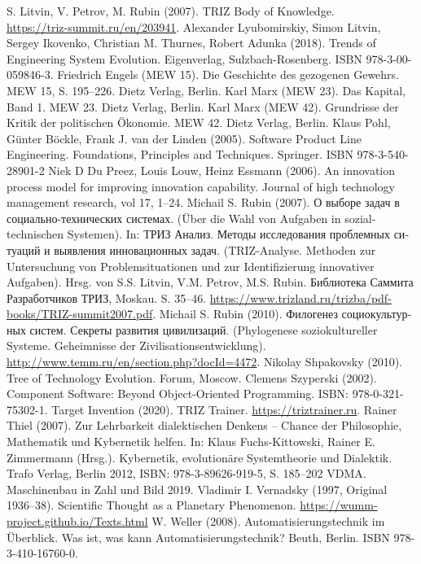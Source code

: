 \documentclass[11pt,a4paper]{article}
\begin{document}
\begin{thebibliography}{xxx}
 S. Litvin, V. Petrov, M. Rubin (2007). TRIZ Body of
  Knowledge. \\ \url{https://triz-summit.ru/en/203941}.
 Alexander Lyubomirskiy, Simon Litvin, Sergey Ikovenko,
  Christian M. Thurnes, Robert Adunka (2018). Trends of Engineering System
  Evolution. Eigenverlag, Sulzbach-Rosenberg.  ISBN 978-3-00-059846-3.
 Friedrich Engels (MEW 15). Die Geschichte des gezogenen
  Gewehrs.  MEW 15, S. 195--226. Dietz Verlag, Berlin.
 Karl Marx (MEW 23). Das Kapital, Band 1. MEW 23. Dietz Verlag,
  Berlin.
 Karl Marx (MEW 42). Grundrisse der Kritik der politischen
  Ökonomie.  MEW 42. Dietz Verlag, Berlin.
 Klaus Pohl, Günter Böckle, Frank J. van der Linden (2005).
  Software Product Line Engineering. Foundations, Principles and Techniques.
  Springer. ISBN 978-3-540-28901-2
 Niek D Du Preez, Louis Louw, Heinz Essmann (2006). An
  innovation process model for improving innovation capability.  Journal of
  high technology management research, vol 17, 1--24.
 Michail S. Rubin (2007). \foreignlanguage{russian}{О
  выборе задач в социально-технических системах}. (Über die Wahl von Aufgaben
  in sozial-technischen Systemen). In: \foreignlanguage{russian}{ТРИЗ Анализ.
    Методы исследования проблемных ситуаций и выявления инновационных
    задач}. (TRIZ-Analyse. Methoden zur Untersuchung von Problemsituationen
  und zur Identifizierung innovativer Aufgaben). Hrsg. von S.S. Litvin,
  V.M. Petrov, M.S. Rubin. \foreignlanguage{russian}{Библиотека Саммита
    Разработчиков ТРИЗ}, Moskau. S. 35--46.
  \url{https://www.trizland.ru/trizba/pdf-books/TRIZ-summit2007.pdf}.
 Michail S. Rubin (2010).
  \foreignlanguage{russian}{Филогенез социокультурных систем. Секреты развития
    цивилизаций}.  (Phylogenese soziokultureller Systeme. Geheimnisse der
  Zivilisationsentwicklung).
  \url{http://www.temm.ru/en/section.php?docId=4472}.
 Nikolay Shpakovsky (2010).  Tree of Technology
  Еvolution. Forum, Moscow.
 Clemens Szyperski (2002). Component Software: Beyond
  Object-Oriented Programming. ISBN: 978-0-321-75302-1.
 Target Invention (2020). TRIZ Trainer.
  \url{https://triztrainer.ru}.
 Rainer Thiel (2007). Zur Lehrbarkeit dialektischen Denkens
  – Chance der Philosophie, Mathematik und Kybernetik helfen. In: Klaus
  Fuchs-Kittowski, Rainer E. Zimmermann (Hrsg.). Kybernetik, evolutionäre
  Systemtheorie und Dialektik. Trafo Verlag, Berlin 2012, ISBN:
  978-3-89626-919-5, S. 185--202
 VDMA. Maschinenbau in Zahl und Bild 2019. 
 Vladimir I. Vernadsky (1997, Original 1936--38).
  Scientific Thought as a Planetary Phenomenon.
  \url{https://wumm-project.github.io/Texts.html}
 W. Weller (2008). Automatisierungstechnik im
  Überblick. Was ist, was kann Automatisierungstechnik? Beuth, Berlin. ISBN
  978-3-410-16760-0.

\end{thebibliography}
\end{document}
